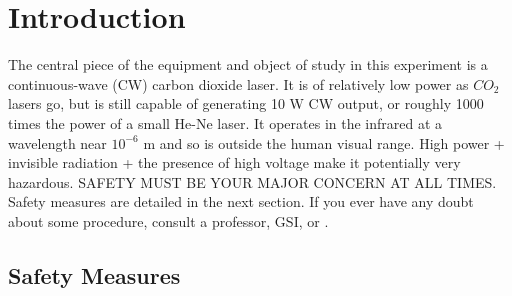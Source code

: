 \documentclass{../lab}
\begin{document}
\section{Introduction}

The central piece of the equipment and object of study in this experiment is a continuous-wave (CW) carbon dioxide laser. It is of relatively low power as $CO_2$ lasers go, but is still capable of generating 10 W CW output, or roughly 1000 times the power of a small He-Ne laser. It operates in the infrared at a wavelength near $10^{-6}$ m and so is outside the human visual range. High power + invisible radiation + the presence of high voltage make it potentially very hazardous. SAFETY MUST BE YOUR MAJOR CONCERN AT ALL TIMES. Safety measures are detailed in the next section. If you ever have any doubt about some procedure, consult a professor, GSI, or \LabEngineer.

\subsection{Safety Measures}
\end{document}

